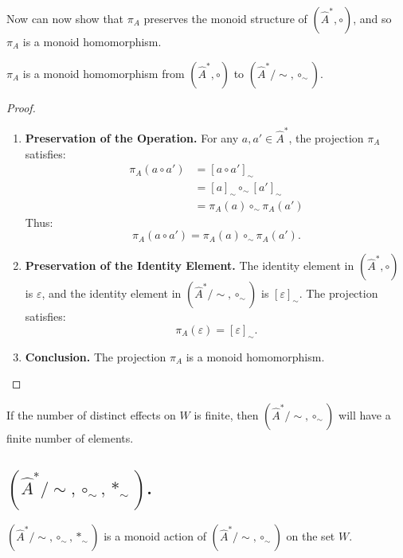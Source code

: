 Now can now show that $\pi_{A}$ preserves the monoid structure of $(\hat{A}^{\ast}, \circ)$, and so $\pi_{A}$ is a monoid homomorphism.
\begin{proposition}
	$\pi_{A}$ is a monoid homomorphism from $(\hat{A}^{\ast}, \circ)$ to $(\hat{A}^{\ast}/\sim, \circ_{\sim})$.
\end{proposition}
\begin{proof}
	\begin{enumerate}
		\item \textbf{Preservation of the Operation.}
		      For any $a, a' \in \hat{A}^{\ast}$, the projection $\pi_{A}$ satisfies:
		      \begin{align}
			      \pi_{A}(a \circ a') & = [a \circ a']_{\sim}                 \\
			                          & = [a]_{\sim} \circ_{\sim} [a']_{\sim} \\
			                          & = \pi_{A}(a) \circ_{\sim} \pi_{A}(a')
		      \end{align}
		      Thus:
		      \begin{equation}
			      \pi_{A}(a \circ a') = \pi_{A}(a) \circ_{\sim} \pi_{A}(a').
		      \end{equation}

		\item \textbf{Preservation of the Identity Element.}
		      The identity element in $(\hat{A}^{\ast}, \circ)$ is $\varepsilon$, and the identity element in $(\hat{A}^{\ast}/\sim, \circ_{\sim})$ is $[\varepsilon]_{\sim}$.
		      The projection satisfies:
		      \begin{equation}
			      \pi_{A}(\varepsilon) = [\varepsilon]_{\sim}.
		      \end{equation}

		\item \textbf{Conclusion.}
		      The projection $\pi_{A}$ is a monoid homomorphism.
	\end{enumerate}
\end{proof}

If the number of distinct effects on $W$ is finite, then $(\hat{A}^{\ast}/\sim, \circ_{\sim})$ will have a finite number of elements.

\subsection{$(\hat{A}^{\ast}/\sim, \circ_{\sim}, \ast_{\sim})$.}

\begin{proposition}
	$(\hat{A}^{\ast}/\sim, \circ_{\sim}, \ast_{\sim})$ is a monoid action of $(\hat{A}^{\ast}/\sim, \circ_{\sim})$ on the set $W$.
\end{proposition}

